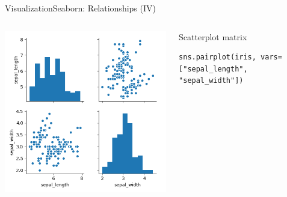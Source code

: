 \documentclass[10pt,compress]{beamer} %
\begin{document}
\begin{frame}[fragile]{Visualization}{Seaborn: Relationships (IV)}
\begin{columns}
	\includegraphics[width=\textwidth]{figs/sns-pair.png}\\
	\begin{exampleblock}{\footnotesize{Scatterplot matrix}}
	\vspace{-0.2cm} 
	\begin{lstlisting}[basicstyle=\tiny]
	sns.pairplot(iris, vars=["sepal_length", "sepal_width"])
	\end{lstlisting}
	\vspace{-0.2cm} 
	\end{exampleblock}

	\end{columns}
\end{frame}
\end{document}

